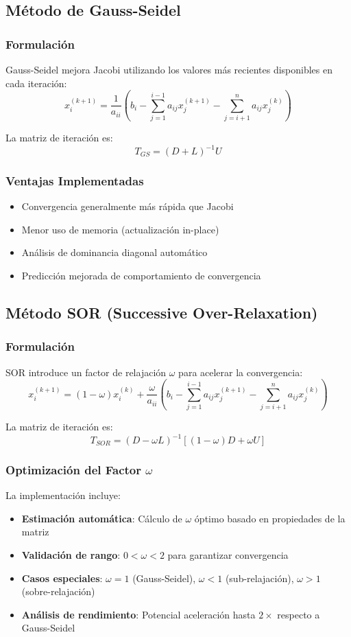 \subsection{Método de Gauss-Seidel}

\subsubsection{Formulación}
Gauss-Seidel mejora Jacobi utilizando los valores más recientes disponibles en cada iteración:
\[
x_i^{(k+1)} = \frac{1}{a_{ii}}\left(b_i - \sum_{j=1}^{i-1} a_{ij} x_j^{(k+1)} - \sum_{j=i+1}^{n} a_{ij} x_j^{(k)}\right)
\]

La matriz de iteración es:
\[
T_{GS} = (D + L)^{-1}U
\]

\subsubsection{Ventajas Implementadas}
\begin{itemize}
    \item Convergencia generalmente más rápida que Jacobi
    \item Menor uso de memoria (actualización in-place)
    \item Análisis de dominancia diagonal automático
    \item Predicción mejorada de comportamiento de convergencia
\end{itemize}

\subsection{Método SOR (Successive Over-Relaxation)}

\subsubsection{Formulación}
SOR introduce un factor de relajación $\omega$ para acelerar la convergencia:
\[
x_i^{(k+1)} = (1-\omega)x_i^{(k)} + \frac{\omega}{a_{ii}}\left(b_i - \sum_{j=1}^{i-1} a_{ij} x_j^{(k+1)} - \sum_{j=i+1}^{n} a_{ij} x_j^{(k)}\right)
\]

La matriz de iteración es:
\[
T_{SOR} = (D - \omega L)^{-1}[(1-\omega)D + \omega U]
\]

\subsubsection{Optimización del Factor $\omega$}
La implementación incluye:
\begin{itemize}
    \item \textbf{Estimación automática}: Cálculo de $\omega$ óptimo basado en propiedades de la matriz
    \item \textbf{Validación de rango}: $0 < \omega < 2$ para garantizar convergencia
    \item \textbf{Casos especiales}: $\omega = 1$ (Gauss-Seidel), $\omega < 1$ (sub-relajación), $\omega > 1$ (sobre-relajación)
    \item \textbf{Análisis de rendimiento}: Potencial aceleración hasta $2\times$ respecto a Gauss-Seidel
\end{itemize}

